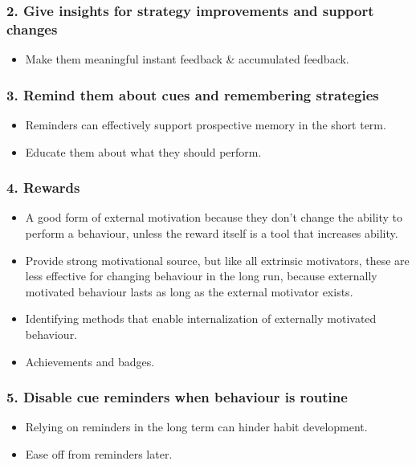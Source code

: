 \subsubsection*{2. Give insights for strategy improvements and support changes}
  \begin{itemize}
    \item Make them meaningful instant feedback \& accumulated feedback.
  \end{itemize}

\subsubsection*{3. Remind them about cues and remembering strategies}
  \begin{itemize}
    \item Reminders can effectively support prospective memory in the short term.
    \item Educate them about what they should perform.
  \end{itemize}

\subsubsection*{4. Rewards}
  \begin{itemize}
    \item A good form of external motivation because they don't change the ability to perform a behaviour, unless the reward itself is a tool that increases ability.
    \item Provide strong motivational source, but like all extrinsic motivators, these are less effective for changing behaviour in the long run, because externally motivated behaviour lasts as long as the external motivator exists.
    \item Identifying methods that enable internalization of externally motivated behaviour.
    \item Achievements and badges.
  \end{itemize}

\subsubsection*{5. Disable cue reminders when behaviour is routine}
  \begin{itemize}
    \item Relying on reminders in the long term can hinder habit development.
    \item Ease off from reminders later.
  \end{itemize}

